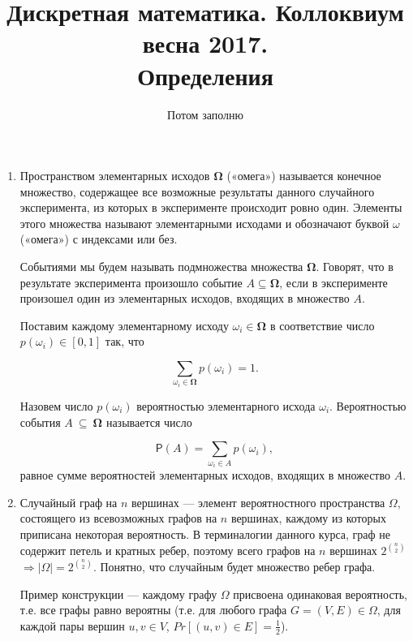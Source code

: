 \documentclass[a4paper,12pt]{article}
\begin{document}
	\title{Дискретная математика. Коллоквиум весна 2017.\\ Определения}
	\author{Потом заполню}
	\maketitle
	
	\begin{enumerate}
	
	 \item 
    
	Пространством элементарных исходов   ${\mathbf \Omega}$ («омега») называется конечное множество, содержащее все возможные результаты 	данного случайного эксперимента, из которых в эксперименте происходит ровно один. Элементы этого множества называют элементарными исходами  и обозначают буквой $\omega$ («омега») с индексами или без.

	Событиями  мы будем называть подмножества множества ${\mathbf \Omega}$. Говорят, что в результате эксперимента произошло событие  	$A\subseteq \mathbf \Omega$, если в эксперименте произошел один из элементарных исходов, входящих в множество $A$.

	Поставим каждому элементарному исходу  $\omega_i\in \mathbf\Omega$ в соответствие число  $p (\omega_i)\in [0,1]$ так, что

	\[\sum_{\omega_i\in \mathbf\Omega} p(\omega_i) =1.\]

	Назовем число $p (\omega_i)$ вероятностью  элементарного исхода $\omega_i$. Вероятностью  события $A~\subseteq~\mathbf\Omega$ 	называется число

	$${\mathsf P}(A) = \sum_{\omega_i\in A} p(\omega_i),$$
	равное сумме вероятностей элементарных исходов, входящих в множество $A$.
	\item 
    
    Случайный граф на $n$ вершинах --- элемент вероятностного пространства $\Omega$, состоящего из всевозможных графов на $n$ вершинах, каждому из которых приписана некоторая вероятность. В терминалогии данного курса, граф не содержит петель и кратных ребер, поэтому всего графов на $n$ вершинах $2^{n \choose 2}$ $\Rightarrow |\Omega| = 2^{n \choose 2}$. Понятно, что случайным будет множество ребер графа.
    
    Пример конструкции --- каждому графу $\Omega$ присвоена одинаковая вероятность, т.е. все графы равно вероятны (т.е. для любого графа $G = (V, E) \in \Omega$, для каждой пары вершин $u, v \in V$, $Pr[(u, v) \in E] = \frac{1}{2}$).
    

\end{enumerate}
\end{document}
